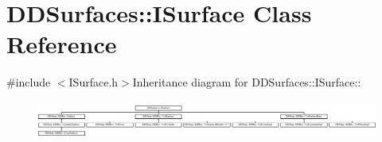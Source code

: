 \hypertarget{class_d_d_surfaces_1_1_i_surface}{
\section{DDSurfaces::ISurface Class Reference}
\label{class_d_d_surfaces_1_1_i_surface}
}


{\ttfamily \#include $<$ISurface.h$>$}Inheritance diagram for DDSurfaces::ISurface::\begin{figure}[H]
\begin{center}
\leavevmode
\includegraphics[height=1.26482cm]{class_d_d_surfaces_1_1_i_surface}
\end{center}
\end{figure}
